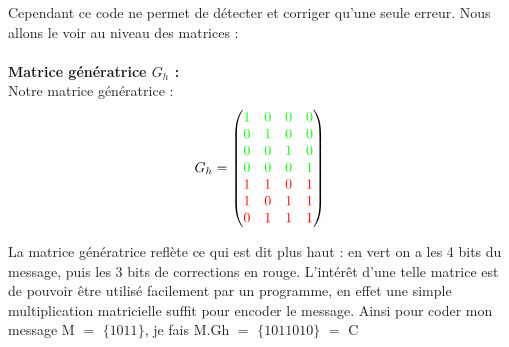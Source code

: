 \documentclass[12pt]{article}
\begin{document}
Cependant ce code ne permet de détecter et corriger qu'une seule erreur. Nous allons le voir au niveau des matrices :
\\
\\ \textbf{Matrice génératrice $G_h$ :}
\\
Notre matrice génératrice :\\
\begin{align*}
  G_h =
  \left(
    \begin{matrix}
      \textcolor{green}{1} & \textcolor{green}{0} & \textcolor{green}{0} & \textcolor{green}{0} \\
      \textcolor{green}{0} & \textcolor{green}{1} & \textcolor{green}{0} & \textcolor{green}{0} \\
      \textcolor{green}{0} & \textcolor{green}{0} & \textcolor{green}{1} & \textcolor{green}{0} \\
      \textcolor{green}{0} & \textcolor{green}{0} & \textcolor{green}{0} & \textcolor{green}{1} \\
      \textcolor{red}{1} & \textcolor{red}{1} & \textcolor{red}{0} & \textcolor{red}{1} \\
      \textcolor{red}{1} & \textcolor{red}{0} & \textcolor{red}{1} & \textcolor{red}{1} \\
      \textcolor{red}{0} & \textcolor{red}{1} & \textcolor{red}{1} & \textcolor{red}{1}
    \end{matrix}
  \right)
\end{align*}

La matrice génératrice reflète ce qui est dit plus haut : en vert on a les 4 bits du message, puis les 3 bits de corrections en rouge. L'intérêt d’une telle matrice est de pouvoir être utilisé facilement par un programme, en effet une simple multiplication matricielle suffit pour encoder le message.
Ainsi pour coder mon message M $=$ $\{1011\}$, je fais M.Gh $=$ $\{1011010\}$ $=$ C
\\ \\
\end{document}
